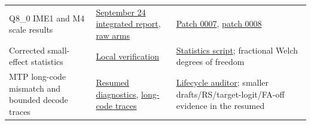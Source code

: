 \documentclass[10pt,a4paper]{article}
\begin{document}
\begin{longtable}[]{@{}lll@{}}
\begin{minipage}[t]{0.30\columnwidth}\raggedright
Q8\_0 IME1 and M4 scale results\strut
\end{minipage} & \begin{minipage}[t]{0.30\columnwidth}\raggedright
\href{https://github.com/MoyaMryia/riscv-accl/blob/main/spacemit/reports/2026-09-24-integrated-k1.md}{September
24 integrated report},
\href{https://github.com/MoyaMryia/riscv-accl/blob/main/spacemit/reports/raw/2026-09-24-integrated}{raw
arms}\strut
\end{minipage} & \begin{minipage}[t]{0.30\columnwidth}\raggedright
\href{https://github.com/MoyaMryia/riscv-accl/blob/main/spacemit/patches/0007-q8-ime1.patch}{Patch
0007},
\href{https://github.com/MoyaMryia/riscv-accl/blob/main/spacemit/patches/0008-ime-m4-scale.patch}{patch
0008}\strut
\end{minipage}\tabularnewline
\begin{minipage}[t]{0.30\columnwidth}\raggedright
Corrected small-effect statistics\strut
\end{minipage} & \begin{minipage}[t]{0.30\columnwidth}\raggedright
\href{https://github.com/MoyaMryia/riscv-accl/blob/main/spacemit/reports/2026-09-28-local-verification.md}{Local
verification}\strut
\end{minipage} & \begin{minipage}[t]{0.30\columnwidth}\raggedright
\href{https://github.com/MoyaMryia/riscv-accl/blob/main/spacemit/bench/paired-stats.py}{Statistics
script}; fractional Welch degrees of freedom\strut
\end{minipage}\tabularnewline
\begin{minipage}[t]{0.30\columnwidth}\raggedright
MTP long-code mismatch and bounded decode traces\strut
\end{minipage} & \begin{minipage}[t]{0.30\columnwidth}\raggedright
\href{https://github.com/MoyaMryia/riscv-accl/blob/main/spacemit/reports/2026-09-27-resumed-measures.md}{Resumed
diagnostics},
\href{https://github.com/MoyaMryia/riscv-accl/blob/main/spacemit/reports/raw/2026-09-25-lifecycle/lifecycle-code-long.jsonl}{long-code
traces}\strut
\end{minipage} & \begin{minipage}[t]{0.30\columnwidth}\raggedright
\href{https://github.com/MoyaMryia/riscv-accl/blob/main/spacemit/bench/audit-lifecycle.py}{Lifecycle
auditor}; smaller drafts/RS/target-logit/FA-off evidence in the resumed

\end{minipage}
\end{longtable}
\end{document}
